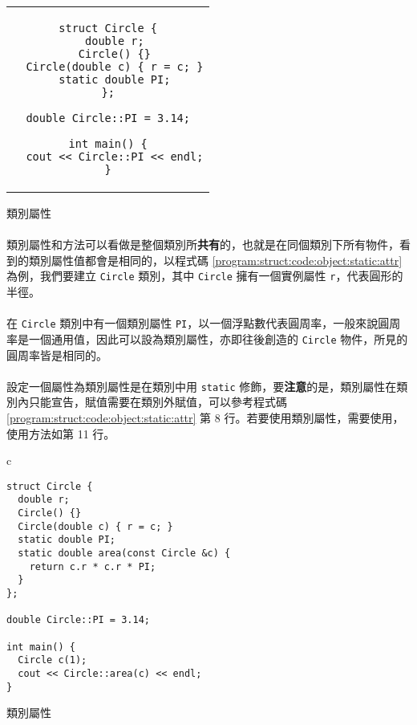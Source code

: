 \documentclass[12pt,a4paper,oneside]{report}
\begin{document}
\begin{CJK}{UTF8}{bkai}
\begin{code}[h!]
\centering
\begin{tabular}{c}
\begin{lstlisting}
struct Circle {
  double r;
  Circle() {}
  Circle(double c) { r = c; }
  static double PI;
};

double Circle::PI = 3.14;

int main() {
  cout << Circle::PI << endl;
}
\end{lstlisting}
\end{tabular}
\caption{類別屬性}
\label{program:struct:code:object:static:attr}
\end{code}

\paragraph{}類別屬性和方法可以看做是整個類別所\textbf{共有}的，也就是在同個類別下所有物件，看到的類別屬性值都會是相同的，以程式碼 \ref{program:struct:code:object:static:attr} 為例，我們要建立 \lstinline!Circle! 類別，其中 \lstinline!Circle! 擁有一個實例屬性 \lstinline!r!，代表圓形的半徑。
\paragraph{}在 \lstinline!Circle! 類別中有一個類別屬性 \lstinline!PI!，以一個浮點數代表圓周率，一般來說圓周率是一個通用值，因此可以設為類別屬性，亦即往後創造的 \lstinline!Circle! 物件，所見的圓周率皆是相同的。
\paragraph{}設定一個屬性為類別屬性是在類別中用 \lstinline!static! 修飾，要{\color{red}\textbf{注意}}的是，類別屬性在類別內只能宣告，賦值需要在類別外賦值，可以參考程式碼 \ref{program:struct:code:object:static:attr} 第 8 行。若要使用類別屬性，需要使用，使用方法如第 11 行。

\begin{code}[h!]
\centering
\begin{tabular}{c}
\begin{lstlisting}
struct Circle {
  double r;
  Circle() {}
  Circle(double c) { r = c; }
  static double PI;
  static double area(const Circle &c) {
    return c.r * c.r * PI;
  }
};

double Circle::PI = 3.14;

int main() {
  Circle c(1);
  cout << Circle::area(c) << endl;
}
\end{lstlisting}
\end{tabular}
\caption{類別屬性}
\label{program:struct:code:object:static:method}
\end{code}


\end{CJK}
\end{document}
